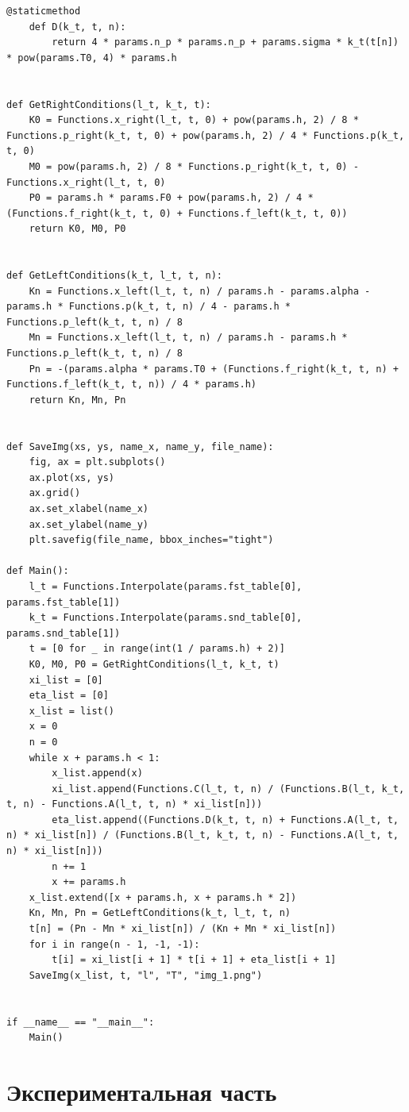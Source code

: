 \documentclass[a4paper,oneside,12pt]{extreport}
\begin{document}
\begin{lstlisting}[]
	@staticmethod
	def D(k_t, t, n):
		return 4 * params.n_p * params.n_p + params.sigma * k_t(t[n]) * pow(params.T0, 4) * params.h


def GetRightConditions(l_t, k_t, t):
	K0 = Functions.x_right(l_t, t, 0) + pow(params.h, 2) / 8 * Functions.p_right(k_t, t, 0) + pow(params.h, 2) / 4 * Functions.p(k_t, t, 0)
	M0 = pow(params.h, 2) / 8 * Functions.p_right(k_t, t, 0) - Functions.x_right(l_t, t, 0)
	P0 = params.h * params.F0 + pow(params.h, 2) / 4 * (Functions.f_right(k_t, t, 0) + Functions.f_left(k_t, t, 0))
	return K0, M0, P0


def GetLeftConditions(k_t, l_t, t, n):
	Kn = Functions.x_left(l_t, t, n) / params.h - params.alpha - params.h * Functions.p(k_t, t, n) / 4 - params.h * Functions.p_left(k_t, t, n) / 8
	Mn = Functions.x_left(l_t, t, n) / params.h - params.h * Functions.p_left(k_t, t, n) / 8
	Pn = -(params.alpha * params.T0 + (Functions.f_right(k_t, t, n) + Functions.f_left(k_t, t, n)) / 4 * params.h)
	return Kn, Mn, Pn


def SaveImg(xs, ys, name_x, name_y, file_name):
	fig, ax = plt.subplots()
	ax.plot(xs, ys)
	ax.grid()
	ax.set_xlabel(name_x)
	ax.set_ylabel(name_y)
	plt.savefig(file_name, bbox_inches="tight")

def Main():
	l_t = Functions.Interpolate(params.fst_table[0], params.fst_table[1])
	k_t = Functions.Interpolate(params.snd_table[0], params.snd_table[1])
	t = [0 for _ in range(int(1 / params.h) + 2)]
	K0, M0, P0 = GetRightConditions(l_t, k_t, t)
	xi_list = [0]
	eta_list = [0]
	x_list = list()
	x = 0
	n = 0
	while x + params.h < 1:
		x_list.append(x)
		xi_list.append(Functions.C(l_t, t, n) / (Functions.B(l_t, k_t, t, n) - Functions.A(l_t, t, n) * xi_list[n]))
		eta_list.append((Functions.D(k_t, t, n) + Functions.A(l_t, t, n) * xi_list[n]) / (Functions.B(l_t, k_t, t, n) - Functions.A(l_t, t, n) * xi_list[n]))
		n += 1
		x += params.h
	x_list.extend([x + params.h, x + params.h * 2])
	Kn, Mn, Pn = GetLeftConditions(k_t, l_t, t, n)
	t[n] = (Pn - Mn * xi_list[n]) / (Kn + Mn * xi_list[n])
	for i in range(n - 1, -1, -1):
		t[i] = xi_list[i + 1] * t[i + 1] + eta_list[i + 1]
	SaveImg(x_list, t, "l", "T", "img_1.png")


if __name__ == "__main__":
	Main()
\end{lstlisting}

\newpage 

\section{Экспериментальная часть}
\end{document}
